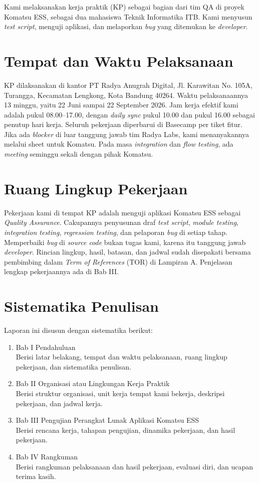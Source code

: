 Kami melaksanakan kerja praktik\label{ist:kp} (KP) sebagai bagian dari tim QA di proyek Komatsu ESS, sebagai dua mahasiswa Teknik Informatika ITB. Kami menyusun \textit{test script}, menguji aplikasi, dan melaporkan \textit{bug} yang ditemukan ke \textit{developer}.

\section{Tempat dan Waktu Pelaksanaan}
KP dilaksanakan di kantor PT Radya Anugrah Digital, Jl. Karawitan No. 105A, Turangga, Kecamatan Lengkong, Kota Bandung 40264. Waktu pelaksanaannya 13 minggu, yaitu 22 Juni sampai 22 September 2026. Jam kerja efektif kami adalah pukul 08.00--17.00, dengan \textit{daily sync} pukul 10.00 dan pukul 16.00 sebagai penutup hari kerja. Seluruh pekerjaan diperbarui di Basecamp per tiket fitur. Jika ada \textit{blocker} di luar tanggung jawab tim Radya Labs, kami menanyakannya melalui sheet untuk Komatsu. Pada masa \textit{integration} dan \textit{flow testing}, ada \textit{meeting} seminggu sekali dengan pihak Komatsu.

\section{Ruang Lingkup Pekerjaan}
Pekerjaan kami di tempat KP adalah menguji aplikasi Komatsu ESS sebagai \textit{Quality Assurance}. Cakupannya penyusunan draf \textit{test script}, \textit{module testing}, \textit{integration testing}, \textit{regression testing}, dan pelaporan \textit{bug} di setiap tahap. Memperbaiki \textit{bug} di \textit{source code} bukan tugas kami, karena itu tanggung jawab \textit{developer}. Rincian lingkup, hasil, batasan, dan jadwal sudah disepakati bersama pembimbing dalam \textit{Term of References}\label{ist:tor} (TOR) di Lampiran A. Penjelasan lengkap pekerjaannya ada di Bab III.

\section{Sistematika Penulisan}
Laporan ini disusun dengan sistematika berikut:

\begin{enumerate}[label=\arabic*)]
\item Bab I Pendahuluan\\
Berisi latar belakang, tempat dan waktu pelaksanaan, ruang lingkup pekerjaan, dan sistematika penulisan.
\item Bab II Organisasi atau Lingkungan Kerja Praktik\\
Berisi struktur organisasi, unit kerja tempat kami bekerja, deskripsi pekerjaan, dan jadwal kerja.
\item Bab III Pengujian Perangkat Lunak Aplikasi Komatsu ESS\\
Berisi rencana kerja, tahapan pengujian, dinamika pekerjaan, dan hasil pekerjaan.
\item Bab IV Rangkuman\\
Berisi rangkuman pelaksanaan dan hasil pekerjaan, evaluasi diri, dan ucapan terima kasih.
\end{enumerate}
